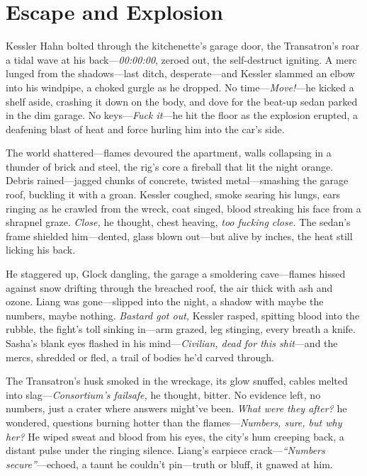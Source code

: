 \documentclass[12pt]{book}
\begin{document}
\section{Escape and Explosion}

Kessler Hahn bolted through the kitchenette’s garage door, the Transatron’s roar a tidal wave at his back—\textit{00:00:00}, zeroed out, the self-destruct igniting. A merc lunged from the shadows—last ditch, desperate—and Kessler slammed an elbow into his windpipe, a choked gurgle as he dropped. No time—\textit{Move!}—he kicked a shelf aside, crashing it down on the body, and dove for the beat-up sedan parked in the dim garage. No keys—\textit{Fuck it}—he hit the floor as the explosion erupted, a deafening blast of heat and force hurling him into the car’s side.

The world shattered—flames devoured the apartment, walls collapsing in a thunder of brick and steel, the rig’s core a fireball that lit the night orange. Debris rained—jagged chunks of concrete, twisted metal—smashing the garage roof, buckling it with a groan. Kessler coughed, smoke searing his lungs, ears ringing as he crawled from the wreck, coat singed, blood streaking his face from a shrapnel graze. \textit{Close,} he thought, chest heaving, \textit{too fucking close.} The sedan’s frame shielded him—dented, glass blown out—but alive by inches, the heat still licking his back.

He staggered up, Glock dangling, the garage a smoldering cave—flames hissed against snow drifting through the breached roof, the air thick with ash and ozone. Liang was gone—slipped into the night, a shadow with maybe the numbers, maybe nothing. \textit{Bastard got out,} Kessler rasped, spitting blood into the rubble, the fight’s toll sinking in—arm grazed, leg stinging, every breath a knife. Sasha’s blank eyes flashed in his mind—\textit{Civilian, dead for this shit}—and the mercs, shredded or fled, a trail of bodies he’d carved through.

The Transatron’s husk smoked in the wreckage, its glow snuffed, cables melted into slag—\textit{Consortium’s failsafe,} he thought, bitter. No evidence left, no numbers, just a crater where answers might’ve been. \textit{What were they after?} he wondered, questions burning hotter than the flames—\textit{Numbers, sure, but why her?} He wiped sweat and blood from his eyes, the city’s hum creeping back, a distant pulse under the ringing silence. Liang’s earpiece crack—\textit{“Numbers secure”}—echoed, a taunt he couldn’t pin—truth or bluff, it gnawed at him.
\end{document}
